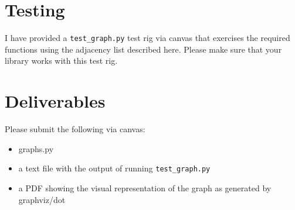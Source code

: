 \begin{fullwidth}
\section{Testing}

I have provided a {\tt test\_graph.py} test rig via canvas that exercises the required functions using the adjacency list described here. Please make sure that your library works with this test rig.

\section{Deliverables}

Please submit the following via canvas:
 
\begin{itemize}
\item graphs.py
\item a text file with the output of running {\tt test\_graph.py}
\item a PDF showing the visual representation of the graph as generated by graphviz/dot
\end{itemize}

\end{fullwidth}
